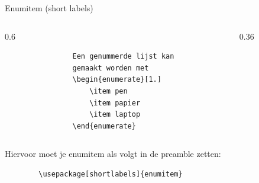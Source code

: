 \begin{frame}[fragile, t]{Enumitem (short labels)}
	\begin{columns}[t]
		\hspace{-0.6\textwidth}
		\begin{column}{0.6\textwidth}
			\begin{verbatim}
				Een genummerde lijst kan 
				gemaakt worden met
				\begin{enumerate}[1.]
					\item pen
					\item papier
					\item laptop
				\end{enumerate}
			\end{verbatim}
			\par
		\end{column}
		
		\hspace{0.6\textwidth}
		\begin{column}{0.36\textwidth}
			\vspace{2mm}
		\end{column}
	\end{columns}
	\vspace{1cm}
	Hiervoor moet je enumitem als volgt in de preamble zetten: \begin{verbatim}
		\usepackage[shortlabels]{enumitem}
	\end{verbatim}
\end{frame}

